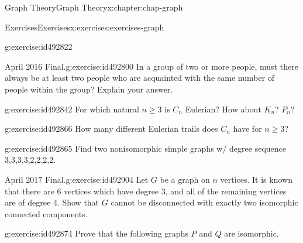 \documentclass[oneside,10pt,]{book}
\numberwithin{equation}{section}
\begin{document}
\begin{chapterptx}{Graph Theory}{}{Graph Theory}{}{}{x:chapter:chap-graph}
\begin{exercises-section}{Exercises}{}{Exercises}{}{}{x:exercises:exercises-graph}
\begin{divisionexercise}{6}{}{}{g:exercise:id492822}
\end{divisionexercise}%
\begin{divisionexercise}{7}{April 2016 Final.}{}{g:exercise:id492800}%
In a group of two or more people, must there always be at least two people who are acquainted with the same number of people within the group? Explain your answer.%
\end{divisionexercise}%
\begin{divisionexercise}{8}{}{}{g:exercise:id492842}%
For which natural \(n \geq 3\) is \(C_n\) Eulerian? How about \(K_n\)? \(P_n\)?%
\end{divisionexercise}%
\begin{divisionexercise}{9}{}{}{g:exercise:id492866}%
How many different Eulerian trails does \(C_n\) have for \(n \geq 3\)?%
\end{divisionexercise}%
\begin{divisionexercise}{10}{}{}{g:exercise:id492865}%
Find two nonisomorphic simple graphs w\slash{} degree sequence 3,3,3,3,2,2,2,2.%
\end{divisionexercise}%
\begin{divisionexercise}{11}{April 2017 Final.}{}{g:exercise:id492904}%
Let \(G\) be a graph on \(n\) vertices. It is known that there are 6 vertices which have degree 3, and all of the remaining vertices are of degree 4. Show that \(G\) cannot be disconnected with exactly two isomorphic connected components.%
\end{divisionexercise}%
\begin{divisionexercise}{12}{}{}{g:exercise:id492874}%
Prove that the following graphs \(P\) and \(Q\) are isomorphic.%
\begin{sidebyside}{2}{0.25}{0.25}{0.04}%
\begin{sbspanel}{0.24}%
\end{sbspanel}
\end{sidebyside}
\end{divisionexercise}
\end{exercises-section}
\end{chapterptx}
\end{document}
